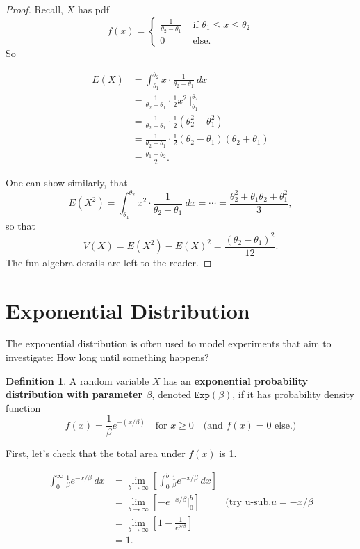 \documentclass[
]{book}
\theoremstyle{definition}
\newtheorem{definition}{Definition}[chapter]
\theoremstyle{definition}
\theoremstyle{definition}
\theoremstyle{definition}
\theoremstyle{remark}
\begin{document}
\begin{proof}
Recall, \(X\) has pdf
\[
f(x)=
\begin{cases}
\frac{1}{\theta_2 - \theta_1} &\text{ if }\theta_1 \leq x \leq \theta_2 \\
0 &\text{ else.} 
\end{cases}
\]
So

\begin{align*}
E(X) &= \int_{\theta_1}^{\theta_2} x \cdot \frac{1}{\theta_2-\theta_1}~dx\\
      &= \frac{1}{\theta_2-\theta_1} \cdot \frac{1}{2}x^2 ~\biggr|_{\theta_1}^{\theta_2}\\
      &= \frac{1}{\theta_2-\theta_1} \cdot \frac{1}{2}(\theta_2^2-\theta_1^2) \\
      &= \frac{1}{\theta_2-\theta_1} \cdot \frac{1}{2}(\theta_2-\theta_1)(\theta_2+\theta_1) \\
      &= \frac{\theta_1+\theta_2}{2}.
\end{align*}

One can show similarly, that \[E(X^2) = \int_{\theta_1}^{\theta_2} x^2 \cdot \frac{1}{\theta_2-\theta_1}~dx = \cdots =  \frac{\theta_2^2 + \theta_1\theta_2 + \theta_1^2}{3},\]
so that \[V(X) = E(X^2) - E(X)^2 = \frac{(\theta_2-\theta_1)^2}{12}.\] The fun algebra details are left to the reader.
\end{proof}

\section{Exponential Distribution}\label{exponential-distribution}

The exponential distribution is often used to model experiments that aim to investigate: How long until something happens?

\begin{definition}
\protect\hypertarget{def:exp-distribution}{}\label{def:exp-distribution}A random variable \(X\) has an \textbf{exponential probability distribution with parameter \(\beta\)}, denoted \(\texttt{Exp}(\beta)\), if it has probability density function
\[
f(x)=
\frac{1}{\beta}e^{-(x/\beta)} ~~~ \text{ for }x \geq 0~~~ \text{ (and }f(x) = 0\text{ else.)}
\]
\end{definition}

First, let's check that the total area under \(f(x)\) is 1.

\begin{align*}
\int_0^\infty \frac{1}{\beta}e^{-x/\beta}~dx &= \lim_{b\to\infty}\left[\int_0^b \frac{1}{\beta}e^{-x/\beta}~dx\right] \\
&= \lim_{b\to\infty}\left[-e^{-x/\beta}\biggr|_0^b \right] & \text{(try u-sub.} u=-x/\beta \\
&= \lim_{b \to \infty}\left[1 - \frac{1}{e^{b/\beta}}\right]\\
&= 1.
\end{align*}
\end{document}
